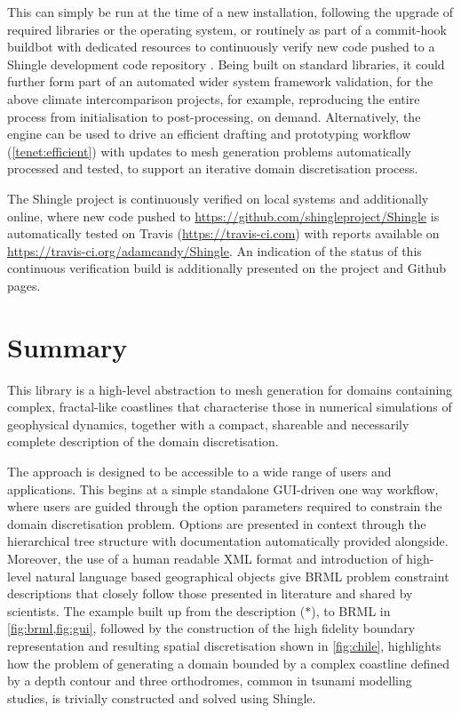 \documentclass[a4paper, 10pt]{book}
\providecommand{\shingle}{Shingle\xspace}
\providecommand{\brml}{BRML\xspace}
\providecommand{\brep}{boundary representation\xspace}
\providecommand{\refdescriptionquotelink}{(\protect\hyperlink{description}{$\ast$})\xspace}
\begin{document}
This can simply be run at the time of a new installation, 
following the upgrade of required libraries or the operating system,
or routinely as part of a commit-hook buildbot with dedicated resources to continuously verify new code pushed to a \shingle development code repository \citep[see, for example,][]{farrell11}.
%
Being built on standard libraries, it could further form part of an automated 
wider system framework validation, for the above climate intercomparison projects, for example, reproducing the entire process from initialisation to post-processing, on demand.
%
Alternatively, the engine can be used to drive an efficient drafting and prototyping workflow (\cref{tenet:efficient}) with updates to mesh generation problems automatically processed and tested,
to support an iterative domain discretisation process.

The \shingle project is continuously verified on local systems and additionally online, where new code pushed to 
\url{https://github.com/shingleproject/Shingle}
is automatically tested on Travis
(\url{https://travis-ci.com})
with reports available on 
\url{https://travis-ci.org/adamcandy/Shingle}.
%
An indication of the status of this continuous verification build is additionally
presented on the project and Github pages.

\chapter{Summary}
\label{sec:summary}
%
This library is a high-level abstraction to mesh generation for domains containing complex, fractal-like coastlines that characterise those in numerical simulations of geophysical dynamics,
together with a 
compact, shareable and necessarily complete description of the domain discretisation.

The approach is designed to be accessible to a wide range of users and applications.
This begins at a simple standalone GUI-driven one way workflow,
where users are guided through the option parameters required to constrain the domain discretisation problem.
Options are presented in context through the hierarchical tree structure with documentation automatically provided alongside.
%
Moreover, the use of a human readable XML format and introduction of high-level natural language based geographical objects give \brml problem constraint descriptions that closely follow those presented in literature and shared by scientists.
%
The example
built up from the description
\refdescriptionquotelink,
to \brml in \cref{fig:brml,fig:gui},
followed by the construction of
the high fidelity \brep and resulting spatial discretisation 
shown in \cref{fig:chile}, highlights how the problem of generating a domain bounded by a complex coastline defined by a depth contour and three orthodromes,
common in tsunami modelling studies, is trivially constructed and solved using \shingle.
\end{document}
